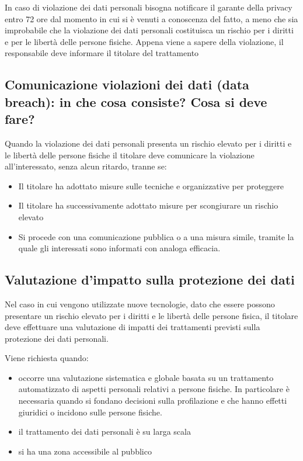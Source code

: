 In caso di violazione dei dati personali bisogna notificare il garante della privacy entro 72 ore dal momento in cui si è venuti a conoscenza del fatto, a meno che sia improbabile che la violazione dei dati personali costituisca un rischio per i diritti e per le libertà delle persone fisiche.
\newline
Appena viene a sapere della violazione, il responsabile deve informare il titolare del trattamento

\subsection{Comunicazione violazioni dei dati (data breach): in che cosa consiste? Cosa si deve fare?}

Quando la violazione dei dati personali presenta un rischio elevato per i diritti e le libertà delle persone fisiche il titolare deve comunicare la violazione all'interessato, senza alcun ritardo, tranne se:
\begin{itemize}
    \item Il titolare ha adottato misure sulle tecniche e organizzative per proteggere
    \item Il titolare ha successivamente adottato misure per scongiurare un rischio elevato
    \item Si procede con una comunicazione pubblica o a una misura simile, tramite la quale gli interessati sono informati con analoga efficacia.
\end{itemize}

\subsection{Valutazione d’impatto sulla protezione dei dati}

Nel caso in cui vengono utilizzate nuove tecnologie, dato che essere possono presentare un rischio elevato per i diritti e le libertà delle persone fisica, il titolare deve effettuare una valutazione di impatti dei trattamenti previsti sulla protezione dei dati personali.

Viene richiesta quando:
\begin{itemize}
    \item occorre una valutazione sistematica e globale basata su un trattamento automatizzato di aspetti personali relativi a persone fisiche.
    In particolare è necessaria quando si fondano decisioni sulla profilazione e che hanno effetti giuridici o incidono sulle persone fisiche.
    \item il trattamento dei dati personali è su larga scala
    \item si ha una zona accessibile al pubblico
\end{itemize}

